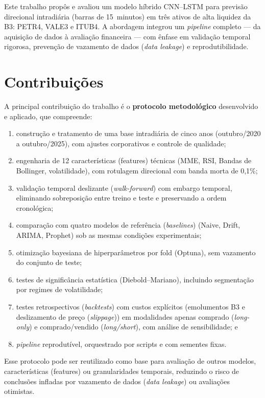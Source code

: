 
Este trabalho propôs e avaliou um modelo híbrido CNN--LSTM para previsão direcional intradiária
(barras de 15~minutos) em três ativos de alta liquidez da B3: PETR4, VALE3 e ITUB4.
A abordagem integrou um \textit{pipeline} completo --- da aquisição de dados à avaliação financeira ---
com ênfase em validação temporal rigorosa, prevenção de vazamento de dados (\textit{data leakage}) e reprodutibilidade.

\section*{Contribuições}

A principal contribuição do trabalho é o \textbf{protocolo metodológico} desenvolvido e aplicado,
que compreende:

\begin{enumerate}[label=\roman*.]
  \item construção e tratamento de uma base intradiária de cinco anos (outubro/2020 a outubro/2025),
  com ajustes corporativos e controle de qualidade;
  \item engenharia de 12 características (features) técnicas (MME, RSI, Bandas de Bollinger, volatilidade),
  com rotulagem direcional com banda morta de 0,1\%;
  \item validação temporal deslizante (\textit{walk-forward}) com embargo temporal, eliminando sobreposição entre treino
  e teste e preservando a ordem cronológica;
  \item comparação com quatro modelos de referência (\textit{baselines}) (Naive, Drift, ARIMA, Prophet) sob as mesmas
  condições experimentais;
  \item otimização bayesiana de hiperparâmetros por fold (Optuna), sem vazamento do conjunto de teste;
  \item testes de significância estatística (Diebold--Mariano), incluindo segmentação por regimes
  de volatilidade;
  \item testes retrospectivos (\textit{backtests}) com custos explícitos (emolumentos B3 e deslizamento de preço (\textit{slippage})) em modalidades
  apenas comprado (\textit{long-only}) e comprado/vendido (\textit{long/short}), com análise de sensibilidade; e
  \item \textit{pipeline} reprodutível, orquestrado por scripts e com sementes fixas.
\end{enumerate}

Esse protocolo pode ser reutilizado como base para avaliação de outros modelos, características (features)
ou granularidades temporais, reduzindo o risco de conclusões infladas por vazamento de dados (\textit{data leakage})
ou avaliações otimistas.

